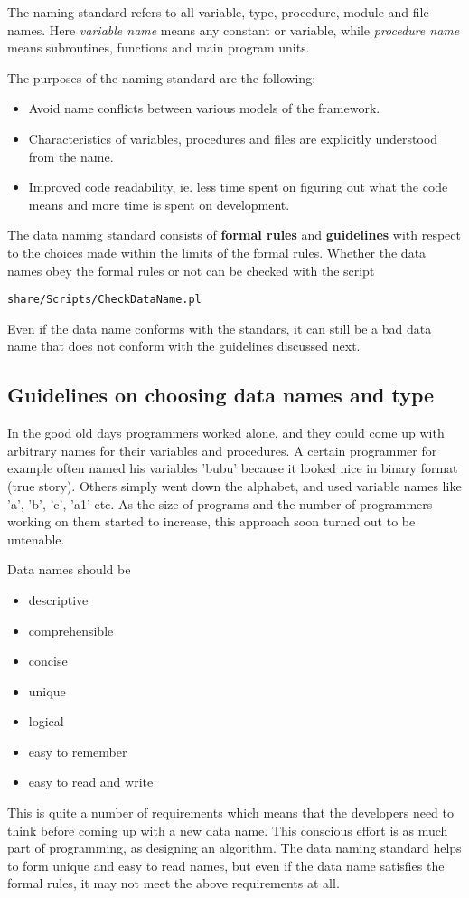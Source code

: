 \documentclass{article}
\begin{document}
The naming standard refers to all variable, type, procedure, module and file 
names. Here {\it variable name} means any constant or variable, while 
{\it procedure name} means subroutines, functions and main program units.

The purposes of the naming standard are the following:
\begin{itemize}
\item Avoid name conflicts between various models of the framework.
\item Characteristics of variables, procedures and files are
      explicitly understood from the name.
\item Improved code readability, ie. less time spent on figuring out 
      what the code means and more time is spent on development.
\end{itemize}

The data naming standard consists of {\bf formal rules} and 
{\bf guidelines} with respect to the choices made within 
the limits of the formal rules.
Whether the data names obey the formal rules or not can be checked
with the script
\begin{verbatim}
share/Scripts/CheckDataName.pl
\end{verbatim}
Even if the data name conforms with the standars, it can still be a bad
data name that does not conform with the guidelines discussed next.

\subsection{Guidelines on choosing data names and type}

In the good old days programmers worked alone, and they could come up
with arbitrary names for their variables and procedures. A certain programmer
for example often named his variables 'bubu' because it looked nice in
binary format (true story). Others simply went down the alphabet, and
used variable names like 'a', 'b', 'c', 'a1' etc. As the size of programs 
and the number of programmers working on them started to increase, this
approach soon turned out to be untenable.

Data names should be
\begin{itemize}
\item descriptive
\item comprehensible
\item concise
\item unique
\item logical
\item easy to remember
\item easy to read and write
\end{itemize}
This is quite a number of requirements which means that the developers need
to think before coming up with a new data name. This conscious effort is 
as much part of programming, as designing an algorithm. The data naming
standard helps to form unique and easy to read names, but even if the 
data name satisfies the formal rules, it may not meet the above 
requirements at all.
\end{document}

